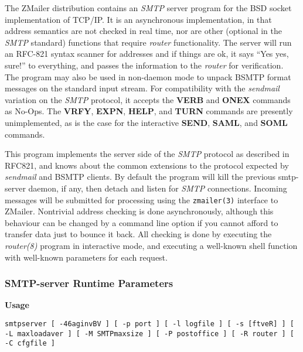 
The ZMailer distribution contains an {\em SMTP\/} server program
for the BSD socket implementation of TCP/IP.
It is an asynchronous implementation, in that address semantics are
not checked in real time, nor are other (optional in the {\em SMTP\/}
standard) functions that require {\em router\/} functionality.
The server will run an RFC-821 syntax scanner for addresses and if
things are ok, it says ``Yes yes, sure!'' to everything, and passes
the information to the {\em router\/} for verification.
The program may also be used in non-daemon mode to unpack BSMTP format
messages on the standard input stream.
For compatibility with the {\em sendmail\/} variation on the {\em SMTP\/}
protocol, it accepts the {\bf VERB} and {\bf ONEX} commands as No-Ops.
The {\bf VRFY}, {\bf EXPN}, {\bf HELP}, and {\bf TURN} commands are
presently unimplemented, as is the case for the interactive {\bf SEND},
{\bf SAML}, and {\bf SOML} commands.

This program implements the server side of the {\em SMTP\/} protocol
as described in RFC821, and knows about the common extensions to
the protocol expected by {\em sendmail\/} and BSMTP clients.
By default the program will kill the previous smtp-server daemon,
if any, then detach and listen for {\em SMTP\/} connections.
Incoming messages will be submitted for processing using the 
{\tt zmailer(3)} interface to ZMailer. Nontrivial address checking is 
done asynchronously, although this behaviour can be changed by a command 
line option if you cannot afford to transfer data just to bounce it back. 
All checking is done by executing the {\em router(8)\/} program in 
interactive mode, and executing a well-known shell function with well-known 
parameters for each request.




\subsubsection{SMTP-server Runtime Parameters}



{\bf Usage}

{\tt smtpserver [ -46aginvBV ] [ -p port ] [ -l logfile ] [ -s [ftveR] ] [ -L maxloadaver ] [ -M SMTPmaxsize ] [ -P postoffice ] [ -R router ] [ -C cfgfile ]}

